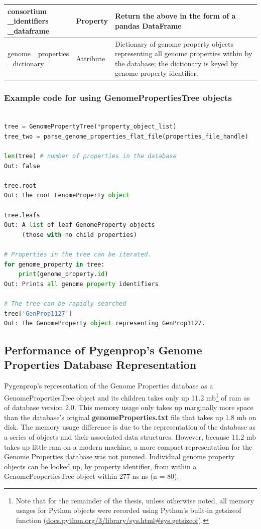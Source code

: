 \begin{longtable}{|p{2.7cm}|p{2cm}|p{10cm}|}
consortium \_identifiers \_dataframe   & Property  & Return the above in the form of a pandas DataFrame  \cite{mckinney2010data}                                                        \\ \hline
genome \_properties \_dictionary    & Attribute  & Dictionary of genome property objects representing all genome properties within by the database; the dictionary is keyed by genome property identifier.                              \\ \hline
\end{longtable}

\subsubsection{Example code for using GenomePropertiesTree objects}

\begin{lstlisting}[language=Python]

tree = GenomePropertyTree(*property_object_list)
tree_two = parse_genome_properties_flat_file(properties_file_handle)
	
len(tree) # number of properties in the database
Out: false

tree.root
Out: The root FenomeProperty object

tree.leafs
Out: A list of leaf GenomeProperty objects 
     (those with no child properties)

# Properties in the tree can be iterated.
for genome_property in tree: 
	print(genome_property.id)
Out: Prints all genome property identifiers

# The tree can be rapidly searched
tree['GenProp1127'] 
Out: The GenomeProperty object representing GenProp1127.

\end{lstlisting}

\subsection{Performance of Pygenprop's Genome Properties Database Representation}

Pygenprop's representation of the Genome Properties database as a GenomePropertiesTree object and its children takes only up 11.2 \gls{mb}\footnote{Note that for the remainder of the thesis, unless otherwise noted, all memory usages for Python objects were recorded using Python's built-in getsizeof function (\href{http://docs.python.org/3/library/sys.html\#sys.getsizeof}{docs.python.org/3/library/sys.html\#sys.getsizeof}).} of \gls{ram} as of database version 2.0. This memory usage only takes up marginally more space than the database's original \textbf{genomeProperties.txt} file that takes up 1.8 \gls{mb} on disk. The memory usage difference is due to the representation of the database as a series of objects and their associated data structures. However, because 11.2 \gls{mb} takes up little \gls{ram} on a modern machine, a more compact representation for the Genome Properties database was not pursued. Individual genome property objects can be looked up, by property identifier, from within a GenomePropertiesTree object within 277 ns  ns (\gls{n} = 80).

